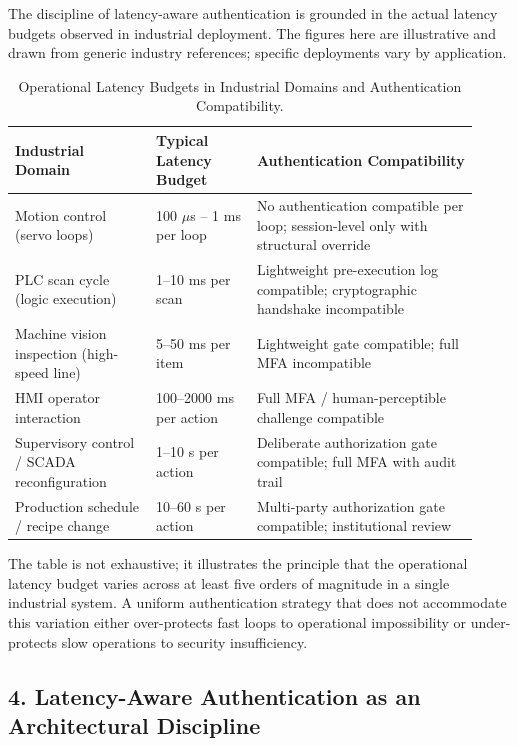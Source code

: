 The discipline of latency-aware authentication is grounded in the actual
latency budgets observed in industrial deployment. The figures here are
illustrative and drawn from generic industry references; specific
deployments vary by application.

\begin{table}[t]
\caption{Operational Latency Budgets in Industrial Domains and Authentication Compatibility.}
\label{tab:latency}
\centering
\renewcommand{\arraystretch}{1.2}
\begin{tabular}{p{0.28\linewidth} p{0.20\linewidth} p{0.44\linewidth}}
\toprule
\textbf{Industrial Domain} & \textbf{Typical Latency Budget} & \textbf{Authentication Compatibility} \\
\midrule
Motion control (servo loops) & 100 $\mu$s -- 1 ms per loop & No authentication compatible per loop; session-level only with structural override \\
PLC scan cycle (logic execution) & 1--10 ms per scan & Lightweight pre-execution log compatible; cryptographic handshake incompatible \\
Machine vision inspection (high-speed line) & 5--50 ms per item & Lightweight gate compatible; full MFA incompatible \\
HMI operator interaction & 100--2000 ms per action & Full MFA / human-perceptible challenge compatible \\
Supervisory control / SCADA reconfiguration & 1--10 s per action & Deliberate authorization gate compatible; full MFA with audit trail \\
Production schedule / recipe change & 10--60 s per action & Multi-party authorization gate compatible; institutional review \\
\bottomrule
\end{tabular}
\end{table}

The table is not exhaustive; it illustrates the principle that the
operational latency budget varies across at least five orders of
magnitude in a single industrial system. A uniform authentication
strategy that does not accommodate this variation either over-protects
fast loops to operational impossibility or under-protects slow
operations to security insufficiency.

\subsection{4. Latency-Aware Authentication as an Architectural
Discipline}\label{latency-aware-authentication-as-an-architectural-discipline}

